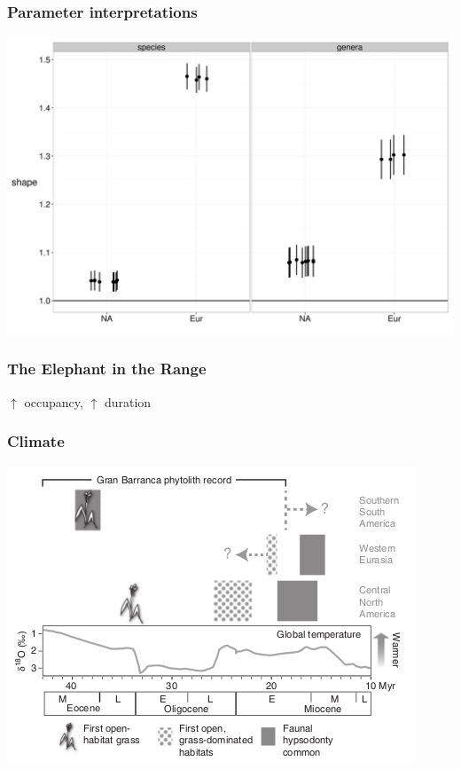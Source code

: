 \documentclass{beamer}
\begin{document}
\begin{frame}
  \frametitle{Parameter interpretations}

  
  \includegraphics[height=0.8\textheight,width=\textwidth,keepaspectratio=true]{figure/shape_est}


\end{frame}

\begin{frame}
  \frametitle{The Elephant in the Range}


  \(\uparrow\) occupancy, \(\uparrow\) duration

\end{frame}

\begin{frame}
  \frametitle{Climate}

  \includegraphics[height=0.8\textheight,width=\textwidth,keepaspectratio=true]{figure/stromberg}

  \tiny{}
\end{frame}
\end{document}
